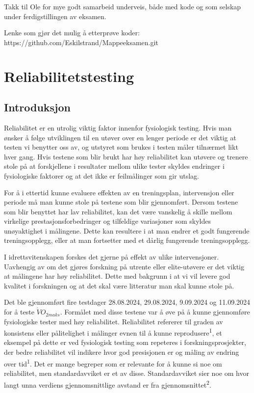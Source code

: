 \documentclass[
  letterpaper,
  DIV=11,
  numbers=noendperiod]{scrreprt}
\begin{document}
Takk til Ole for mye godt samarbeid underveis, både med kode og som
selskap under ferdigstillingen av eksamen.

Lenke som gjør det mulig å etterprøve koder:
https://github.com/Eskilstrand/Mappeeksamen.git


\chapter{Reliabilitetstesting}\label{reliabilitetstesting}

\section{Introduksjon}\label{introduksjon}

Reliabilitet er en utrolig viktig faktor innenfor fysiologisk testing.
Hvis man ønsker å følge utviklingen til en utøver over en lenger periode
er det viktig at testen vi benytter oss av, og utstyret som brukes i
testen måler tilnærmet likt hver gang. Hvis testene som blir brukt har
høy reliabilitet kan utøvere og trenere stole på at forskjellene i
resultater mellom ulike tester skyldes endringer i fysiologiske faktorer
og at det ikke er feilmålinger som gir utslag.

For å i ettertid kunne evaluere effekten av en treningsplan,
intervensjon eller periode må man kunne stole på testene som blir
gjennomført. Dersom testene som blir benyttet har lav reliabilitet, kan
det være vanskelig å skille mellom virkelige prestasjonsforbedringer og
tilfeldige variasjoner som skyldes unøyaktighet i målingene. Dette kan
resultere i at man endrer et godt fungerende treningsopplegg, eller at
man fortsetter med et dårlig fungerende treningsopplegg.

I idrettsvitenskapen forskes det gjerne på effekt av ulike
intervensjoner. Uavhengig av om det gjøres forskning på utrente eller
elite-utøvere er det viktig at målingene har høy reliabilitet. Dette med
bakgrunn i at vi vil levere god kvalitet i forskningen og at det skal
være litteratur man skal kunne stole på.

Det ble gjennomført fire testdager 28.08.2024, 29.08.2024, 9.09.2024 og
11.09.2024 for å teste \(\dot{V}O_{2maks}\). Formålet med disse testene
var å øve på å kunne gjennomføre fysiologiske tester med høy
reliabilitet. Reliabilitet refererer til graden av konsistens eller
pålitelighet i målinger evnen til å kunne
reprodusere\textsuperscript{1}, et eksempel på dette er ved fysiologisk
testing som repeteres i forskningsprosjekter, der bedre reliabilitet vil
indikere hvor god presisjonen er og måling av endring over
tid\textsuperscript{1}. Det er mange begreper som er relevante for å
kunne si noe om reliabilitet, men standardavviket er et av disse.
Standardavviket sier noe om hvor langt unna verdiens gjennomsnittlige
avstand er fra gjennomsnittet\textsuperscript{2}.
\end{document}
